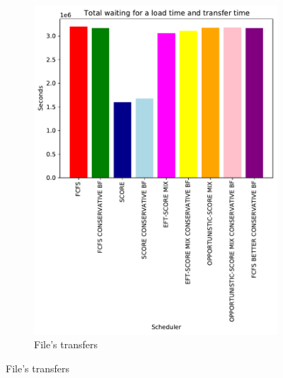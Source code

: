 \documentclass[a4paper]{article}
\begin{document}
\begin{figure}[H]\centering
\begin{subfigure}[b]{0.4\linewidth}\centering\includegraphics[width=0.9\linewidth]{MBSS/plot/Results_FCFS_Score_Backfill_2022-01-21->2022-01-21_V9271_Total_waiting_for_a_load_time_and_transfer_time_450_128_32_256_4_1024.pdf}\caption{File's transfers}\end{subfigure}

\end{figure}
\end{document}
